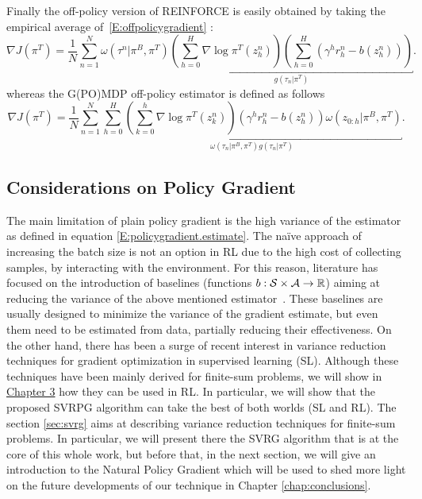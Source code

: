 Finally the off-policy version of REINFORCE is easily obtained by taking the empirical average of~\eqref{E:offpolicygradient} \citep{mastrangelo2015study}:
\[
\nabla J(\pi^T) = \frac{1}{N} \sum_{n=1}^{N} \omega(\tau^n|\pi^B, \pi^T)
\underbracket{
	\left(\sum_{h=0}^{H} \nabla \log \pi^{T}(z_h^n) \right)\left(\sum_{h=0}^{H}\left(\gamma^h r_h^n - b(z_h^n)\right)\right)
}_{g(\tau_n|\pi^T)}.
\]
whereas the G(PO)MDP off-policy estimator is defined as follows \citep{mastrangelo2015study}
\[
\nabla J(\pi^T) = \frac{1}{N} \sum_{n=1}^{N}
\underbracket{
	\sum_{h=0}^H \left(\sum_{k=0}^h \nabla \log\pi^T(z_k^n)\right) \left(\gamma^h r_h^n - b(z_h^n)\right) \omega(z_{0:h}|\pi^B,\pi^T)
}_{\omega(\tau_n|\pi^B,\pi^T)g(\tau_n|\pi^T)}.
\]
\subsection{Considerations on Policy Gradient}
The main limitation of plain policy gradient is the high variance of the estimator as defined in equation \ref{E:policygradient.estimate}.
The na\"ive approach of increasing the batch size is not an option in \acs{RL} due to the high cost of collecting samples, \ie by interacting with the environment.
For this reason, literature has focused on the introduction of baselines (\ie functions $b : \mathcal{S} \times \mathcal{A} \to \mathbb R$) aiming at reducing the variance of the above mentioned estimator~\citep[\eg][]{williams1992simple,peters2008reinforcement,Thomas2017actionbaseline,wu2018variance}.
These baselines are usually designed to minimize the variance of the gradient estimate, but even them need to be estimated from data, partially reducing their effectiveness.
On the other hand, there has been a surge of recent interest in variance reduction techniques for gradient optimization in supervised learning (\acs{SL}).
Although these techniques have been mainly derived for finite-sum problems, we will show in \hyperref[chap:svrpg]{Chapter 3} how they can be used in \acs{RL}.
In particular, we will show that the proposed \acs{SVRPG} algorithm can take the best of both worlds (\ie \acs{SL} and \acs{RL}).
The section \ref{sec:svrg} aims at describing variance reduction techniques for finite-sum problems. In particular, we will present there the \acs{SVRG} algorithm that is at the core of this whole work, but before that, in the next section, we will give an introduction to the Natural Policy Gradient which will be used to shed more light on the future developments of our technique in Chapter  \ref{chap:conclusions}.


